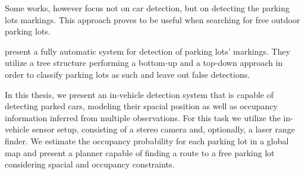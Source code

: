 Some works, however focus not on car detection, but on detecting the parking
lots markings. This approach proves to be useful when searching for free
outdoor parking lots.

\citet{suhr13} present a fully automatic system for detection of parking lots'
markings. They utilize a tree structure performing a bottom-up and a top-down
approach in order to classify parking lots as such and leave out false
detections.

In this thesis, we present an in-vehicle detection system that is capable of
detecting parked cars, modeling their spacial position as well as occupancy
information inferred from multiple observations. For this task we utilize the
in-vehicle sensor setup, consisting of a stereo camera and, optionally, a
laser range finder. We estimate the occupancy probability for each parking lot
in a global map and present a planner capable of finding a route to a free
parking lot considering spacial and occupancy constraints.

